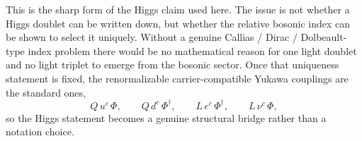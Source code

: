 This is the sharp form of the Higgs claim used here. The issue is not whether a Higgs doublet can be written down, but whether the relative bosonic index can be shown to select it uniquely.
Without a genuine Callias / Dirac / Dolbeault-type index problem there would be no mathematical reason for one light doublet and no light triplet to emerge from the bosonic sector. Once that uniqueness statement is fixed, the renormalizable carrier-compatible Yukawa couplings are the standard ones,
\[
Q\,u^c\,\Phi,
\qquad
Q\,d^c\,\Phi^\dagger,
\qquad
L\,e^c\,\Phi^\dagger,
\qquad
L\,\nu^c\,\Phi,
\]
so the Higgs statement becomes a genuine structural bridge rather than a notation choice.


